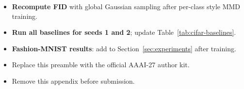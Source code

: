 \documentclass[10pt]{article}
\begin{document}
\begin{itemize}
  \item \textbf{Recompute FID} with global Gaussian sampling after per-class style MMD training.

  \item \textbf{Run all baselines for seeds 1 and 2}; update Table~\ref{tab:cifar-baselines}.

  \item \textbf{Fashion-MNIST results}: add to Section~\ref{sec:experiments} after training.

  \item Replace this preamble with the official AAAI-27 author kit.

  \item Remove this appendix before submission.
\end{itemize}
\end{document}
